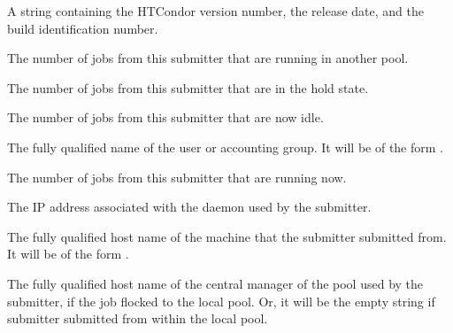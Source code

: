 
\begin{description}

\item[\AdAttr{CondorVersion}:] A string containing the HTCondor version
number, the release date, and the build identification number.

\item[\AdAttr{FlockedJobs}:] The number of jobs from this submitter 
that are running in another pool.

\item[\AdAttr{HeldJobs}:] The number of jobs from this submitter 
that are in the hold state.

\item[\AdAttr{IdleJobs}:] The number of jobs from this submitter 
that are now idle.

\item[\AdAttr{Name}:] The fully qualified name of the user or accounting group.
It will be of the form .

\item[\AdAttr{RunningJobs}:] The number of jobs from this submitter 
that are running now.

\item[\AdAttr{ScheddIpAddr}:] The IP address associated with the
 daemon used by the submitter.

\item[\AdAttr{ScheddName}:] The fully qualified host name of the machine 
that the submitter submitted from.
It will be of the form .

\item[\AdAttr{SubmitterTag}:] The fully qualified host name of the
central manager of the pool used by the submitter,
if the job flocked to the local pool.
Or, it will be the empty string if submitter submitted from within
the local pool.


\end{description}
